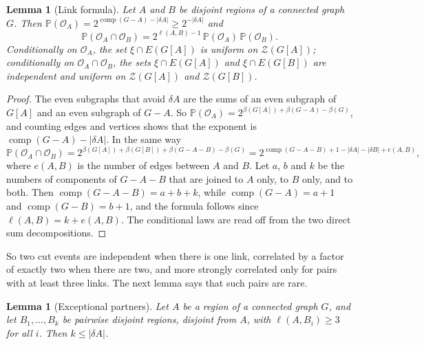 \documentclass[11pt]{article}
\newtheorem{lemma}[theorem]{Lemma}
\theoremstyle{definition}
\theoremstyle{remark}
\newcommand{\Z}{\mathcal{Z}}
\newcommand{\PP}{\mathbb{P}}
\newcommand{\comp}{\operatorname{comp}}
\newcommand{\cO}{\mathcal{O}}
\begin{document}
\begin{lemma}[Link formula]\label{lem:link}
Let $A$ and $B$ be disjoint regions of a connected graph $G$. Then
$\PP(\cO_A)=2^{\comp(G-A)-|\delta A|}\ge2^{-|\delta A|}$ and
\[
  \PP(\cO_A\cap\cO_B)=2^{\ell(A,B)-1}\,\PP(\cO_A)\,\PP(\cO_B).
\]
Conditionally on $\cO_A$, the set $\xi\cap E(G[A])$ is uniform on $\Z(G[A])$; conditionally on
$\cO_A\cap\cO_B$, the sets $\xi\cap E(G[A])$ and $\xi\cap E(G[B])$ are independent and uniform on
$\Z(G[A])$ and $\Z(G[B])$.
\end{lemma}

\begin{proof}
The even subgraphs that avoid $\delta A$ are the sums of an even subgraph of $G[A]$ and an even
subgraph of $G-A$. So $\PP(\cO_A)=2^{\beta(G[A])+\beta(G-A)-\beta(G)}$, and counting edges and
vertices shows that the exponent is $\comp(G-A)-|\delta A|$. In the same way
\[
  \PP(\cO_A\cap\cO_B)=2^{\beta(G[A])+\beta(G[B])+\beta(G-A-B)-\beta(G)}
     =2^{\comp(G-A-B)+1-|\delta A|-|\delta B|+e(A,B)},
\]
where $e(A,B)$ is the number of edges between $A$ and $B$. Let $a$, $b$ and $k$ be the numbers of
components of $G-A-B$ that are joined to $A$ only, to $B$ only, and to both. Then
$\comp(G-A-B)=a+b+k$, while $\comp(G-A)=a+1$ and $\comp(G-B)=b+1$, and the formula follows since
$\ell(A,B)=k+e(A,B)$. The conditional laws are read off from the two direct sum decompositions.
\end{proof}

So two cut events are independent when there is one link, correlated by a factor of exactly two
when there are two, and more strongly correlated only for pairs with at least three links. The next
lemma says that such pairs are rare.

\begin{lemma}[Exceptional partners]\label{lem:exc}
Let $A$ be a region of a connected graph $G$, and let $B_1,\dots,B_k$ be pairwise disjoint regions,
disjoint from $A$, with $\ell(A,B_i)\ge3$ for all $i$. Then $k\le|\delta A|$.
\end{lemma}
\end{document}
